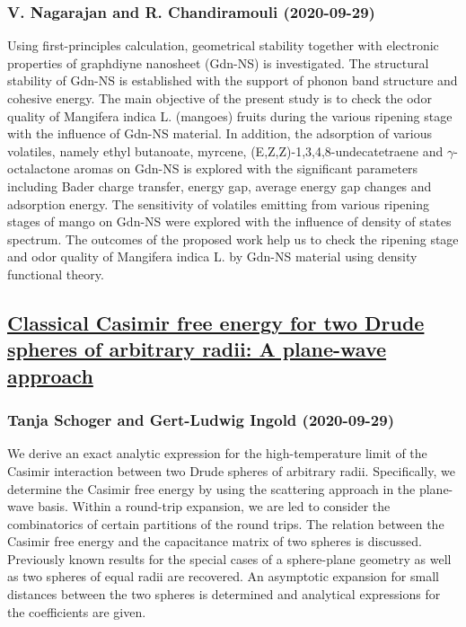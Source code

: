 \subsubsection*{V. Nagarajan and R. Chandiramouli (2020-09-29)}
Using first-principles calculation, geometrical stability together with
electronic properties of graphdiyne nanosheet (Gdn-NS) is investigated. The
structural stability of Gdn-NS is established with the support of phonon band
structure and cohesive energy. The main objective of the present study is to
check the odor quality of Mangifera indica L. (mangoes) fruits during the
various ripening stage with the influence of Gdn-NS material. In addition, the
adsorption of various volatiles, namely ethyl butanoate, myrcene,
(E,Z,Z)-1,3,4,8-undecatetraene and $\gamma$-octalactone aromas on Gdn-NS is
explored with the significant parameters including Bader charge transfer,
energy gap, average energy gap changes and adsorption energy. The sensitivity
of volatiles emitting from various ripening stages of mango on Gdn-NS were
explored with the influence of density of states spectrum. The outcomes of the
proposed work help us to check the ripening stage and odor quality of Mangifera
indica L. by Gdn-NS material using density functional theory.

\subsection*{\href{http://arxiv.org/abs/2009.14090v1}{Classical Casimir free energy for two Drude spheres of arbitrary radii:  A plane-wave approach}}
\subsubsection*{Tanja Schoger and Gert-Ludwig Ingold (2020-09-29)}
We derive an exact analytic expression for the high-temperature limit of the
Casimir interaction between two Drude spheres of arbitrary radii. Specifically,
we determine the Casimir free energy by using the scattering approach in the
plane-wave basis. Within a round-trip expansion, we are led to consider the
combinatorics of certain partitions of the round trips. The relation between
the Casimir free energy and the capacitance matrix of two spheres is discussed.
Previously known results for the special cases of a sphere-plane geometry as
well as two spheres of equal radii are recovered. An asymptotic expansion for
small distances between the two spheres is determined and analytical
expressions for the coefficients are given.

